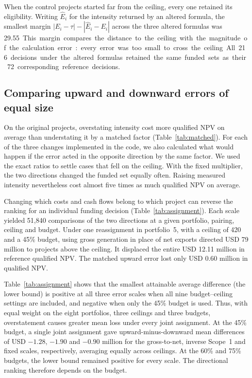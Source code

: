 When the control projects started far from the ceiling, every one retained its eligibility. Writing $\widehat E_i$ for the intensity returned by an altered formula, the smallest margin $|E_i-\tau|-|\widehat E_i-E_i|$ across the three altered formulas was 29.55~\unit. This margin compares the distance to the ceiling with the magnitude of the calculation error: every error was too small to cross the ceiling. All 216 decisions under the altered formulas retained the same funded sets as their 72 corresponding reference decisions.

\subsection{Comparing upward and downward errors of equal size}
On the original projects, overstating intensity cost more qualified NPV on average than understating it by a matched factor (Table~\ref{tab:matched}). For each of the three changes implemented in the code, we also calculated what would happen if the error acted in the opposite direction by the same factor. We used the exact ratios to settle cases that fell on the ceiling. With the fixed multiplier, the two directions changed the funded set equally often. Raising measured intensity nevertheless cost almost five times as much qualified NPV on average.
\ifdefined\readingcopy\fi



Changing which costs and cash flows belong to which project can reverse the ranking for an individual funding decision (Table~\ref{tab:assignment}). Each scale yielded 51,840 comparisons of the two directions at a given portfolio, pairing, ceiling and budget. Under one reassignment in portfolio~5, with a ceiling of 420 and a 45\% budget, using gross generation in place of net exports directed USD 79 million to projects above the ceiling. It displaced the entire USD 12.11 million in reference qualified NPV. The matched upward error lost only USD 0.60 million in qualified NPV.
\ifdefined\readingcopy\fi



Table~\ref{tab:assignment} shows that the smallest attainable average difference (the lower bound) is positive at all three error scales when all nine budget--ceiling settings are included, and negative when only the 45\% budget is used. Thus, with equal weight on the eight portfolios, three ceilings and three budgets, overstatement causes greater mean loss under every joint assignment. At the 45\% budget, a single joint assignment gave upward-minus-downward mean differences of USD $-1.28$, $-1.90$ and $-0.90$ million for the gross-to-net, inverse Scope~1 and fixed scales, respectively, averaging equally across ceilings. At the 60\% and 75\% budgets, the lower bound remained positive for every scale. The directional ranking therefore depends on the budget.

